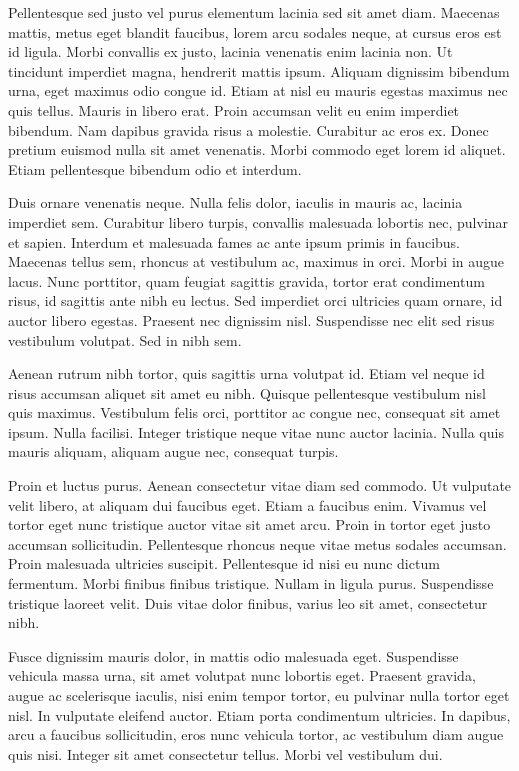 Pellentesque sed justo vel purus elementum lacinia sed sit amet diam. Maecenas mattis, metus eget blandit faucibus, lorem arcu sodales neque, at cursus eros est id ligula. Morbi convallis ex justo, lacinia venenatis enim lacinia non. Ut tincidunt imperdiet magna, hendrerit mattis ipsum. Aliquam dignissim bibendum urna, eget maximus odio congue id. Etiam at nisl eu mauris egestas maximus nec quis tellus. Mauris in libero erat. Proin accumsan velit eu enim imperdiet bibendum. Nam dapibus gravida risus a molestie. Curabitur ac eros ex. Donec pretium euismod nulla sit amet venenatis. Morbi commodo eget lorem id aliquet. Etiam pellentesque bibendum odio et interdum.

Duis ornare venenatis neque. Nulla felis dolor, iaculis in mauris ac, lacinia imperdiet sem. Curabitur libero turpis, convallis malesuada lobortis nec, pulvinar et sapien. Interdum et malesuada fames ac ante ipsum primis in faucibus. Maecenas tellus sem, rhoncus at vestibulum ac, maximus in orci. Morbi in augue lacus. Nunc porttitor, quam feugiat sagittis gravida, tortor erat condimentum risus, id sagittis ante nibh eu lectus. Sed imperdiet orci ultricies quam ornare, id auctor libero egestas. Praesent nec dignissim nisl. Suspendisse nec elit sed risus vestibulum volutpat. Sed in nibh sem.

Aenean rutrum nibh tortor, quis sagittis urna volutpat id. Etiam vel neque id risus accumsan aliquet sit amet eu nibh. Quisque pellentesque vestibulum nisl quis maximus. Vestibulum felis orci, porttitor ac congue nec, consequat sit amet ipsum. Nulla facilisi. Integer tristique neque vitae nunc auctor lacinia. Nulla quis mauris aliquam, aliquam augue nec, consequat turpis.

Proin et luctus purus. Aenean consectetur vitae diam sed commodo. Ut vulputate velit libero, at aliquam dui faucibus eget. Etiam a faucibus enim. Vivamus vel tortor eget nunc tristique auctor vitae sit amet arcu. Proin in tortor eget justo accumsan sollicitudin. Pellentesque rhoncus neque vitae metus sodales accumsan. Proin malesuada ultricies suscipit. Pellentesque id nisi eu nunc dictum fermentum. Morbi finibus finibus tristique. Nullam in ligula purus. Suspendisse tristique laoreet velit. Duis vitae dolor finibus, varius leo sit amet, consectetur nibh.

Fusce dignissim mauris dolor, in mattis odio malesuada eget. Suspendisse vehicula massa urna, sit amet volutpat nunc lobortis eget. Praesent gravida, augue ac scelerisque iaculis, nisi enim tempor tortor, eu pulvinar nulla tortor eget nisl. In vulputate eleifend auctor. Etiam porta condimentum ultricies. In dapibus, arcu a faucibus sollicitudin, eros nunc vehicula tortor, ac vestibulum diam augue quis nisi. Integer sit amet consectetur tellus. Morbi vel vestibulum dui.

